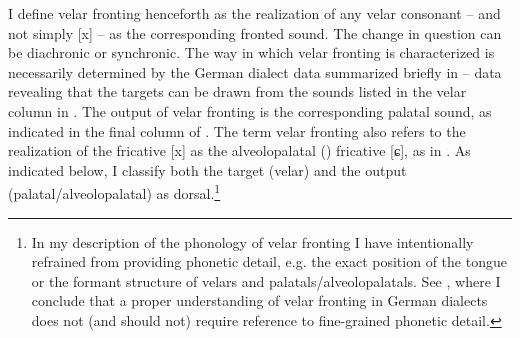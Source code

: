 I define velar fronting henceforth as the realization of any velar consonant -- and not simply [x] -- as the corresponding fronted sound. The change in question can be diachronic or synchronic. The way in which velar fronting is characterized is necessarily determined by the German dialect data summarized briefly in  -- data revealing that the targets can be drawn from the sounds listed in the velar column in . The output of velar fronting is the corresponding palatal sound, as indicated in the final column of . The term velar fronting also refers to the realization of the fricative [x] as the alveolopalatal () fricative [ɕ], as in . As indicated below, I classify both the target (velar) and the output (palatal/alveolopalatal) as dorsal.\footnote{In my description of the phonology of velar fronting I have intentionally refrained from providing phonetic detail, e.g. the exact position of the tongue or the formant structure of velars and palatals\slash alveolopalatals. See , where I conclude that a proper understanding of velar fronting in German dialects does not (and should not) require reference to fine-grained phonetic detail.}

\begin{table}
\caption{Velar fronting targets and outputs\label{tab:1:5}}
\end{table}

